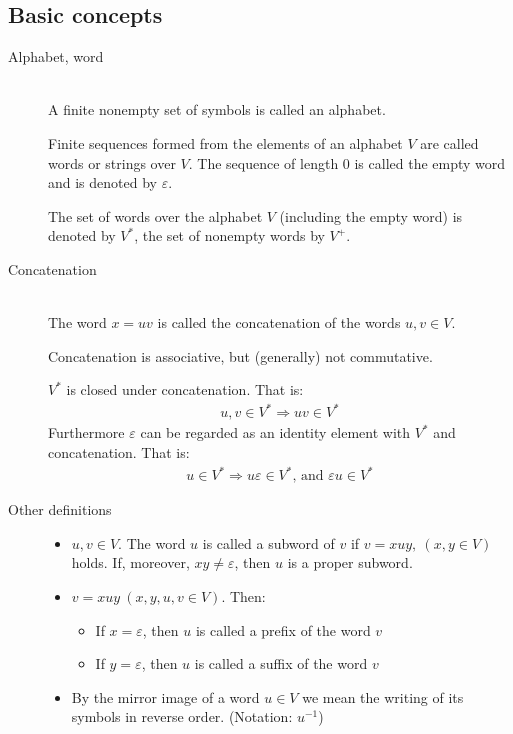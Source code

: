 \documentclass[margin=0px]{article}
\begin{document}
\subsection{Basic concepts}
\begin{description}
    \item[Alphabet, word] \hfill \\
        A finite nonempty set of symbols is called an alphabet.

        Finite sequences formed from the elements of an alphabet $V$ are called words or strings over $V$. The sequence of length 0 is called the empty word and is denoted by
        $\varepsilon$.

        The set of words over the alphabet $V$ (including the empty word) is denoted by $V^*$, the set of nonempty words by $V^+$.

    \item[Concatenation] \hfill \\
        The word $ x = uv$ is called the concatenation of the words $u,v \in V$.

        Concatenation is associative, but (generally) not commutative.

        $V^*$ is closed under concatenation. That is:
        \begin{align*}
            u,v \in V^* \Rightarrow uv \in V^*
        \end{align*}
        Furthermore $\varepsilon$ can be regarded as an identity element with $V^*$ and concatenation. That is:
        \begin{align*}
            u \in V^* \Rightarrow u\varepsilon \in V^* \textrm{, and }\varepsilon u \in V^*
        \end{align*}
    \item[Other definitions] \hfill
        \begin{itemize}
            \item $u,v \in V$. The word $u$ is called a subword of $v$ if $ v = xuy , \ (x,y \in V)$ holds. If, moreover, $xy\neq\varepsilon$, then $u$ is a proper subword.

            \item $ v  = xuy \ (x,y,u,v \in V)$. Then:
                  \begin{itemize}
                      \item If $x=\varepsilon$, then $u$ is called a prefix of the word $v$
                      \item If $y=\varepsilon$, then $u$ is called a suffix of the word $v$
                  \end{itemize}

            \item By the mirror image of a word $u\in V$ we mean the writing of its symbols in reverse order. (Notation: $u^{-1}$)
        \end{itemize}
\end{description}
\end{document}
